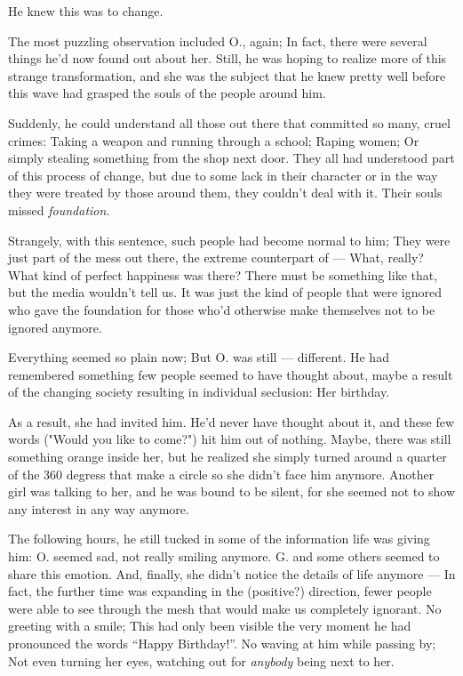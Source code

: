 He knew this was to change.

The most puzzling observation included O., again; In fact, there were several things he'd now found out about her. Still, he was hoping to realize more of this strange transformation, and she was the subject that he knew pretty well before this wave had grasped the souls of the people around him.

Suddenly, he could understand all those out there that committed so many, cruel crimes: Taking a weapon and running through a school; Raping women; Or simply stealing something from the shop next door. They all had understood part of this process of change, but due to some lack in their character or in the way they were treated by those around them, they couldn't deal with it. Their souls missed \emph{foundation}.

Strangely, with this sentence, such people had become normal to him; They were just part of the mess out there, the extreme counterpart of --- What, really? What kind of perfect happiness was there? There must be something like that, but the media wouldn't tell us. It was just the kind of people that were ignored who gave the foundation for those who'd otherwise make themselves not to be ignored anymore.

Everything seemed so plain now; But O. was still --- different. He had remembered something few people seemed to have thought about, maybe a result of the changing society resulting in individual seclusion: Her birthday.

As a result, she had invited him. He'd never have thought about it, and these few words ("Would you like to come?") hit him out of nothing. Maybe, there was still something orange inside her, but he realized she simply turned around a quarter of the 360 degress that make a circle so she didn't face him anymore. Another girl was talking to her, and he was bound to be silent, for she seemed not to show any interest in any way anymore.

The following hours, he still tucked in some of the information life was giving him: O. seemed sad, not really smiling anymore. G. and some others seemed to share this emotion. And, finally, she didn't notice the details of life anymore --- In fact, the further time was expanding in the (positive?) direction, fewer people were able to see through the mesh that would make us completely ignorant. 
No greeting with a smile; This had only been visible the very moment he had pronounced the words \enquote{Happy Birthday!}. 
No waving at him while passing by; Not even turning her eyes, watching out for \emph{anybody} being next to her.

